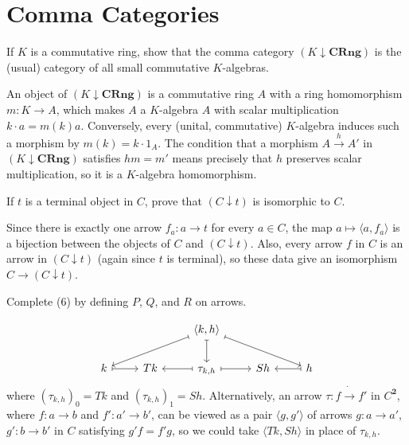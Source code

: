 \section{Comma Categories}

\begin{exercise}
If $K$ is a commutative ring, show that the comma category $(K\downarrow\mathbf{CRng})$ is the (usual) category of all small commutative $K$-algebras.
\end{exercise}
\begin{solution}
An object of $(K\downarrow\mathbf{CRng})$ is a commutative ring $A$ with a ring homomorphism $m:K\to A$, which makes $A$ a $K$-algebra $A$ with scalar multiplication $k\cdot a=m(k)a$. Conversely, every (unital, commutative) $K$-algebra induces such a morphism by $m(k)=k\cdot 1_A$. The condition that a morphism $A\overset{h}{\to} A'$ in $(K\downarrow\mathbf{CRng})$ satisfies $hm=m'$ means precisely that $h$ preserves scalar multiplication, so it is a $K$-algebra homomorphism.
\end{solution}

\begin{exercise}
If $t$ is a terminal object in $C$, prove that $(C\downarrow t)$ is isomorphic to $C$.
\end{exercise}
\begin{solution}
Since there is exactly one arrow $f_a:a\to t$ for every $a\in C$, the map $a\mapsto \langle a,f_a\rangle$ is a bijection between the objects of $C$ and $(C\downarrow t)$. Also, every arrow $f$ in $C$ is an arrow in $(C\downarrow t)$ (again since $t$ is terminal), so these data give an isomorphism $C\to (C\downarrow t)$.
\end{solution}

\begin{exercise}
Complete (6) by defining $P$, $Q$, and $R$ on arrows.
\end{exercise}
\begin{solution}
\vspace{-5pt}\[\begin{tikzcd}
&&\langle k,h\rangle\arrow[dll,mapsto]\arrow[d,mapsto]\arrow[drr,mapsto]&&\\
k\arrow[r,mapsto]&Tk&\tau_{k,h}\arrow[l,mapsto]\arrow[r,mapsto]&Sh&h\arrow[l,mapsto]
\end{tikzcd}\vspace{-5pt}\]
where $(\tau_{k,h})_0=Tk$ and $(\tau_{k,h})_1=Sh$. Alternatively, an arrow $\tau:f\dot{\to} f'$ in $C^{\mathbf{2}}$, where $f:a\to b$ and $f':a'\to b'$, can be viewed as a pair $\langle g,g'\rangle$ of arrows $g:a\to a'$, $g':b\to b'$ in $C$ satisfying $g'f=f'g$, so we could take $\langle Tk, Sh\rangle$ in place of $\tau_{k,h}$.
\end{solution}

